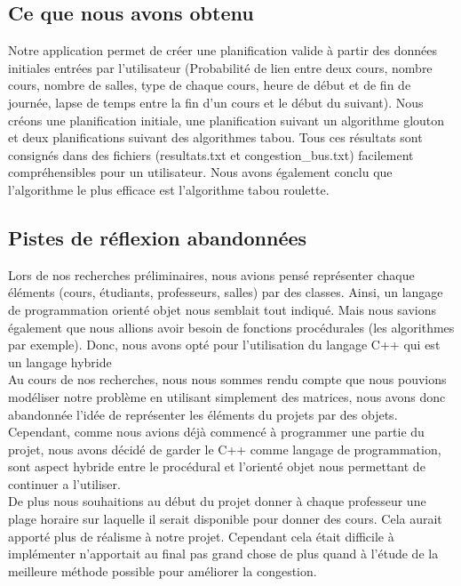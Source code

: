 \documentclass[a4paper,11pt]{article}
\begin{document}
	\subsection{Ce que nous avons obtenu}
		Notre application permet de créer une planification valide à partir des données initiales entrées par l'utilisateur (Probabilité de lien entre deux cours, nombre cours, nombre de salles, type de chaque cours, heure de début et de fin de journée, lapse de temps entre la fin d'un cours et le début du suivant).
		Nous créons une planification initiale, une planification suivant un algorithme glouton et deux planifications suivant des algorithmes tabou. Tous ces résultats sont consignés dans des fichiers (resultats.txt et congestion\_bus.txt) facilement compréhensibles pour un utilisateur.
		Nous avons également conclu que l'algorithme le plus efficace est l'algorithme tabou roulette.
	\subsection{Pistes de réflexion abandonnées}
		Lors de nos recherches préliminaires, nous avions pensé représenter chaque éléments (cours, étudiants, professeurs, salles) par des classes. Ainsi, un langage de programmation orienté objet nous semblait tout indiqué. Mais nous savions également que nous allions avoir besoin de fonctions procédurales (les algorithmes par exemple). Donc, nous avons opté pour l'utilisation du langage C++ qui est un langage hybride\\
		Au cours de nos recherches, nous nous sommes rendu compte que nous pouvions modéliser notre problème en utilisant simplement des matrices, nous avons donc abandonnée l'idée de représenter les éléments du projets par des objets.\\
		Cependant, comme nous avions déjà commencé à programmer une partie du projet, nous avons décidé de garder le C++ comme langage de programmation, sont aspect hybride entre le procédural et l'orienté objet nous permettant de continuer a l'utiliser.\\
		De plus nous souhaitions au début du projet donner à chaque professeur une plage horaire sur laquelle il serait disponible pour donner des cours. Cela aurait apporté plus de réalisme à notre projet. Cependant cela était difficile à implémenter n'apportait au final pas grand chose de plus quand à l'étude de la meilleure méthode possible pour améliorer la congestion.\\
\end{document}
